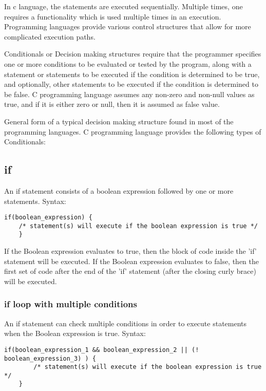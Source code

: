 In c language, the statements are executed sequentially. Multiple times, one requires a functionality which is used multiple times in an execution. Programming languages provide various control structures that allow for more complicated execution paths.

\par Conditionals or Decision making structures require that the programmer specifies one or more conditions to be evaluated or tested by the program, along with a statement or statements to be executed if the condition is determined to be true, and optionally, other statements to be executed if the condition is determined to be false. C programming language assumes any non-zero and non-null values as true, and if it is either zero or null, then it is assumed as false value.

\par General form of a typical decision making structure found in most of the programming languages. C programming language provides the following types of Conditionals:

\subsection{if}
An if statement consists of a boolean expression followed by one or more statements. Syntax:

\begin{lstlisting}[style=CStyle]
    if(boolean_expression) {
    /* statement(s) will execute if the boolean expression is true */
    }
\end{lstlisting}

If the Boolean expression evaluates to true, then the block of code inside the 'if' statement will be executed. If the Boolean expression evaluates to false, then the first set of code after the end of the 'if' statement (after the closing curly brace) will be executed.

\subsubsection{if loop with multiple conditions}
An if statement can check multiple conditions in order to execute statements when the Boolean expression is true. Syntax:

\begin{lstlisting}[style=CStyle]
    if(boolean_expression_1 && boolean_expression_2 || (! boolean_expression_3) ) {
        /* statement(s) will execute if the boolean expression is true */
    } 
\end{lstlisting}

